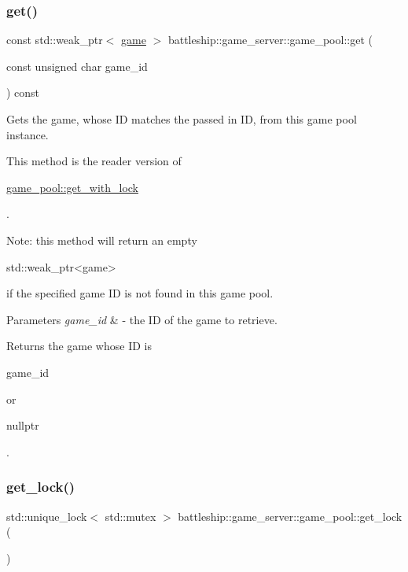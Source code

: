 \subsubsection{\texorpdfstring{get()}{get()}}
{\footnotesize\ttfamily const std\+::weak\+\_\+ptr$<$ \hyperlink{classbattleship_1_1game__server_1_1game}{game} $>$ battleship\+::game\+\_\+server\+::game\+\_\+pool\+::get (\begin{DoxyParamCaption}\item[{const unsigned char}]{game\+\_\+id }\end{DoxyParamCaption}) const}

Gets the game, whose ID matches the passed in ID, from this game pool instance.

This method is the reader version of
\begin{DoxyCode}
\hyperlink{classbattleship_1_1game__server_1_1game__pool_a47ebc8c0b2d4280ce0d02e0d808230e3}{game\_pool::get\_with\_lock} 
\end{DoxyCode}
 .

Note\+: this method will return an empty
\begin{DoxyCode}
std::weak\_ptr<game> 
\end{DoxyCode}
 if the specified game ID is not found in this game pool.


\begin{DoxyParams}{Parameters}
{\em game\+\_\+id} & -\/ the ID of the game to retrieve. \\
\hline
\end{DoxyParams}
\begin{DoxyReturn}{Returns}
the game whose ID is
\begin{DoxyCode}
game\_id 
\end{DoxyCode}
 or
\begin{DoxyCode}
\textcolor{keyword}{nullptr} 
\end{DoxyCode}
 . 
\end{DoxyReturn}
\mbox{\label{classbattleship_1_1game__server_1_1game__pool_ae87384fc2dbf34f7f2769e8763c142b3}} 
\subsubsection{\texorpdfstring{get\+\_\+lock()}{get\_lock()}}
{\footnotesize\ttfamily std\+::unique\+\_\+lock$<$ std\+::mutex $>$ battleship\+::game\+\_\+server\+::game\+\_\+pool\+::get\+\_\+lock (\begin{DoxyParamCaption}{ }\end{DoxyParamCaption})}


